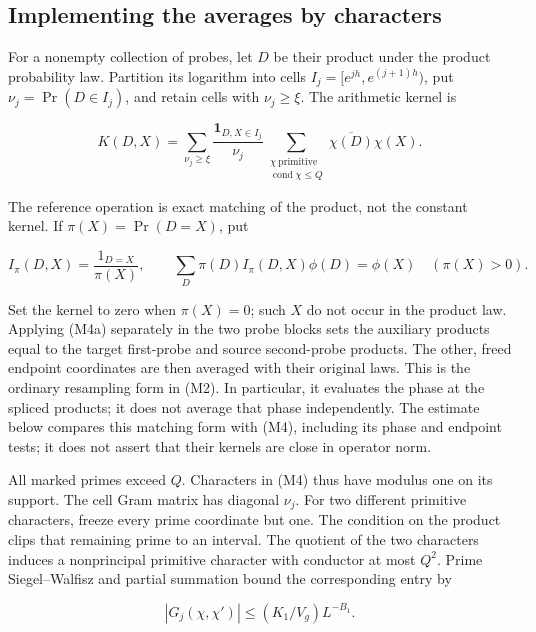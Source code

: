 
\hypertarget{marked-correlation-implementing-the-averages-by-characters}{%
\subsection{Implementing the averages by
characters}\label{marked-correlation-implementing-the-averages-by-characters}}

For a nonempty collection of probes, let \(D\) be their product under
the product probability law. Partition its logarithm into cells
\(I_j=[e^{jh},e^{(j+1)h})\), put \(\nu_j=\Pr(D\in I_j)\), and retain
cells with \(\nu_j\ge\xi\). The arithmetic kernel is

\[
K(D,X)=\sum_{\nu_j\ge\xi}
 \frac{\mathbf1_{D,X\in I_j}}{\nu_j}
 \sum_{\substack{\chi\ \mathrm{primitive}\\\operatorname{cond}\chi\le Q}}
       \overline{\chi(D)}\chi(X). \tag{M4}
\]

The reference operation is exact matching of the product, not the
constant kernel. If \(\pi(X)=\Pr(D=X)\), put

\[
I_\pi(D,X)=\frac{1_{D=X}}{\pi(X)},\qquad
\sum_D\pi(D)I_\pi(D,X)\phi(D)=\phi(X)
\quad(\pi(X)>0).
\tag{M4a}
\]

Set the kernel to zero when \(\pi(X)=0\); such \(X\) do not occur in the
product law. Applying (M4a) separately in the two probe blocks sets the
auxiliary products equal to the target first-probe and source
second-probe products. The other, freed endpoint coordinates are then
averaged with their original laws. This is the ordinary resampling form
in (M2). In particular, it evaluates the phase at the spliced products;
it does not average that phase independently. The estimate below
compares this matching form with (M4), including its phase and endpoint
tests; it does not assert that their kernels are close in operator norm.

All marked primes exceed \(Q\). Characters in (M4) thus have modulus one
on its support. The cell Gram matrix has diagonal \(\nu_j\). For two
different primitive characters, freeze every prime coordinate but one.
The condition on the product clips that remaining prime to an interval.
The quotient of the two characters induces a nonprincipal primitive
character with conductor at most \(Q^2\). Prime Siegel--Walfisz and
partial summation bound the corresponding entry by

\[
|G_j(\chi,\chi')|\le (K_1/V_g)L^{-B_1}.
\]

